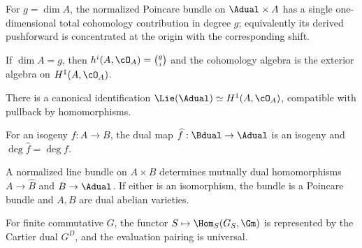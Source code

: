 \begin{theorem}
\label{mumford3-poincare-cohomology}
For $g=\dim A$, the normalized Poincare bundle on $\Adual\times A$ has a
single one-dimensional total cohomology contribution in degree $g$; equivalently
its derived pushforward is concentrated at the origin with the corresponding
shift.
\notready
\end{theorem}

\begin{corollary}
\label{mumford3-structure-sheaf-cohomology}
If $\dim A=g$, then $h^i(A,\cO_A)=\binom gi$ and the cohomology algebra is the
exterior algebra on $H^1(A,\cO_A)$.
\notready
\end{corollary}

\begin{corollary}
\label{mumford3-tangent-dual-h1}
There is a canonical identification
$\Lie(\Adual)\simeq H^1(A,\cO_A)$, compatible with pullback by homomorphisms.
\notready
\end{corollary}

\begin{corollary}
\label{mumford3-dual-isogeny-degree}
For an isogeny $f:A\to B$, the dual map $\widehat f:\Bdual\to\Adual$ is an
isogeny and $\deg\widehat f=\deg f$.
\notready
\end{corollary}

\begin{proposition}
\label{mumford3-divisorial-correspondence}
A normalized line bundle on $A\times B$ determines mutually dual homomorphisms
$A\to\widehat B$ and $B\to\Adual$.  If either is an isomorphism, the bundle is
a Poincare bundle and $A,B$ are dual abelian varieties.
\notready
\end{proposition}

\begin{theorem}
\label{mumford3-cartier-representability}
For finite commutative $G$, the functor
$S\mapsto\Hom_S(G_S,\Gm)$ is represented by the Cartier dual $G^D$, and the
evaluation pairing is universal.
\notready
\end{theorem}

